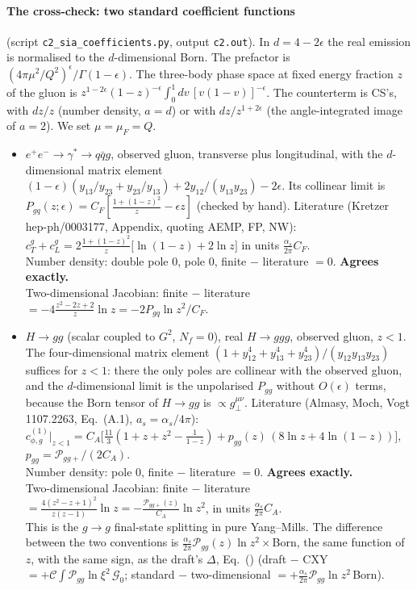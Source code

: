 \paragraph{The cross-check: two standard coefficient functions} (script \texttt{c2\_sia\_coefficients.py}, output \texttt{c2.out}). In $d=4-2\epsilon$ the real emission is normalised to the $d$-dimensional Born. The prefactor is $(4\pi\mu^2/Q^2)^\epsilon/\Gamma(1-\epsilon)$. The three-body phase space at fixed energy fraction $z$ of the gluon is $z^{1-2\epsilon}(1-z)^{-\epsilon}\int_0^1dv\,[v(1-v)]^{-\epsilon}$. The counterterm is CS's, with $dz/z$ (number density, $a=d$) or with $dz/z^{1+2\epsilon}$ (the angle-integrated image of $a=2$). We set $\mu=\mu_F=Q$.
\begin{itemize}
\item $e^+e^-\to\gamma^*\to q\bar q g$, observed gluon, transverse plus longitudinal, with the $d$-dimensional matrix element $(1-\epsilon)(y_{13}/y_{23}+y_{23}/y_{13})+2y_{12}/(y_{13}y_{23})-2\epsilon$. Its collinear limit is $P_{gq}(z;\epsilon)=C_F[\frac{1+(1-z)^2}{z}-\epsilon z]$ (checked by hand). Literature (Kretzer hep-ph/0003177, Appendix, quoting AEMP, FP, NW): $c^g_T+c^g_L=2\frac{1+(1-z)^2}{z}\big[\ln(1-z)+2\ln z\big]$ in units $\frac{\alpha_s}{2\pi}C_F$.\\
Number density: double pole $0$, pole $0$, finite $-$ literature $=0$. \textbf{Agrees exactly.}\\
Two-dimensional Jacobian: finite $-$ literature $=-4\frac{z^2-2z+2}{z}\ln z=-2P_{gq}\ln z^2/C_F$.
\item $H\to gg$ (scalar coupled to $G^2$, $N_f=0$), real $H\to ggg$, observed gluon, $z<1$. The four-dimensional matrix element $(1+y_{12}^4+y_{13}^4+y_{23}^4)/(y_{12}y_{13}y_{23})$ suffices for $z<1$: there the only poles are collinear with the observed gluon, and the $d$-dimensional limit is the unpolarised $P_{gg}$ without $O(\epsilon)$ terms, because the Born tensor of $H\to gg$ is $\propto g_\perp^{\mu\nu}$. Literature (Almasy, Moch, Vogt 1107.2263, Eq.~(A.1), $a_s=\alpha_s/4\pi$): $c^{(1)}_{\phi,g}|_{z<1}=C_A\big[\frac{11}{3}(1+z+z^2-\frac{1}{1-z})+p_{gg}(z)\,(8\ln z+4\ln(1-z))\big]$, $p_{gg}=\mathcal P_{gg+}/(2C_A)$.\\
Number density: pole $0$, finite $-$ literature $=0$. \textbf{Agrees exactly.}\\
Two-dimensional Jacobian: finite $-$ literature $=\frac{4(z^2-z+1)^2}{z(z-1)}\ln z=-\frac{\mathcal P_{gg+}(z)}{C_A}\ln z^2$, in units $\frac{\alpha_s}{2\pi}C_A$.\\
This is the $g\to g$ final-state splitting in pure Yang--Mills. The difference between the two conventions is $\frac{\alpha_s}{2\pi}\mathcal P_{gg}(z)\ln z^2\times$Born, the same function of $z$, with the same sign, as the draft's $\Delta$, Eq.~() (draft $-$ CXY $=+\mathcal C\int\mathcal P_{gg}\ln\xi^2\,\mathcal G_0$; standard $-$ two-dimensional $=+\frac{\alpha_s}{2\pi}\mathcal P_{gg}\ln z^2\,$Born).
\end{itemize}
